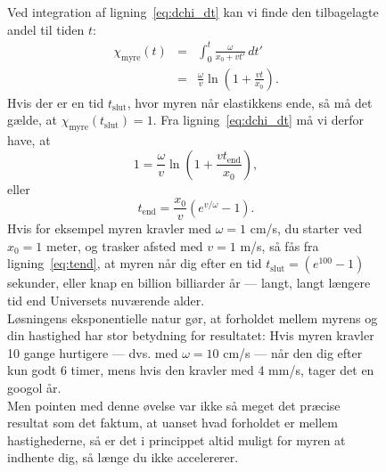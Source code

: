 \documentclass[useAMS,danish]{aa}
\begin{document}
\begin{figure}[!t]
\begin{bclogo}[
    couleur=gray!20,
    epBord=1,
    arrondi=0.1,
    logo=\bcinfo,
    marge=8,
    ombre=false, %
    couleurBord=gray!60,
    barre=line]
{{    Ved integration af ligning~\ref{eq:dchi_dt} kan vi finde den tilbagelagte andel til tiden $t$:
    \begin{eqnarray}
        \label{eq:chit}
        \nonumber
        \chi_\mathrm{myre}(t) & = & \int_0^{t} \frac{\omega}{x_0 + v t'} \, dt'\\
                              & = & \frac{\omega}{v} \ln \left(1+\frac{vt}{x_0}\right).
    \end{eqnarray}
    Hvis der er en tid $t_\mathrm{slut}$, hvor myren når elastikkens ende, så må det gælde, at $\chi_\mathrm{myre}(t_\mathrm{slut}) = 1$.
    Fra ligning~\ref{eq:dchi_dt} må vi derfor have, at
    \begin{equation}
        \nonumber
        1 = \frac{\omega}{v} \ln\left(1+\frac{vt_\mathrm{end}}{x_0}\right),
    \end{equation}
    eller
    \begin{equation}
        \label{eq:tend}
        t_\mathrm{end}=\frac {x_0}{v}\left(e^{v/\omega}-1\right).
    \end{equation}
    Hvis for eksempel myren kravler med $\omega = 1$ cm/s, du starter ved $x_0 = 1$ meter, og trasker afsted med $v = 1$ m/s, så fås fra ligning~\ref{eq:tend}, at myren når dig efter en tid $t_\mathrm{slut} = (e^{100}-1)$ sekunder, eller knap en billion billiarder år --- langt, langt længere tid end Universets nuværende alder.
    \vspace{1mm}\\
    Løsningens eksponentielle natur gør, at forholdet mellem myrens og din hastighed har stor betydning for resultatet:
    Hvis myren kravler 10 gange hurtigere --- dvs. med $\omega = 10$ cm/s --- når den dig efter kun godt 6 timer, mens hvis den kravler med 4 mm/s, tager det en googol år.
    \vspace{1mm}\\
    Men pointen med denne øvelse var ikke så meget det præcise resultat som det faktum, at uanset hvad forholdet er mellem hastighederne, så er det i princippet altid muligt for myren at indhente dig, så længe du ikke accelererer.
    }}
\label{info:myre}
\end{bclogo}
     \endminipage
\end{figure}
\end{document}
